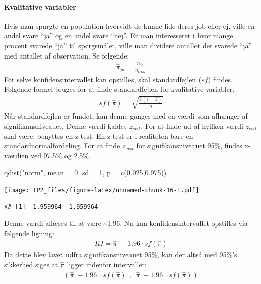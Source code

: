 \documentclass[
]{article}
\newenvironment{Shaded}{\begin{snugshade}}{\end{snugshade}}
\newcommand{\AttributeTok}[1]{\textcolor[rgb]{0.77,0.63,0.00}{#1}}
\newcommand{\DecValTok}[1]{\textcolor[rgb]{0.00,0.00,0.81}{#1}}
\newcommand{\FloatTok}[1]{\textcolor[rgb]{0.00,0.00,0.81}{#1}}
\newcommand{\FunctionTok}[1]{\textcolor[rgb]{0.00,0.00,0.00}{#1}}
\newcommand{\NormalTok}[1]{#1}
\newcommand{\StringTok}[1]{\textcolor[rgb]{0.31,0.60,0.02}{#1}}
\begin{document}
\hypertarget{kvalitative-variabler}{%
\paragraph{Kvalitative variabler}\label{kvalitative-variabler}}

Hvis man spurgte en population hvorvidt de kunne lide deres job eller
ej, ville en andel svare ``ja'' og en andel svare ``nej''. Er man
interesseret i hvor mange procent svarede ``ja'' til spørgsmålet, ville
man dividere antallet der svarede ``ja'' med antallet af observation. Se
følgende: \[
\begin{aligned}
\hat{\pi}_{ja} = \frac{n_{ja}}{n{_{total}}}
\end{aligned}
\] Før selve konfidensintervallet kan opstilles, skal standardfejlen
(\(sf\)) findes. Følgende formel bruges for at finde standardfejlen for
kvalitative variabler: \[
\begin{aligned}
sf(\hat{\pi}) = \sqrt{\frac{\hat{\pi}(1-\hat{\pi})}n{}}
\end{aligned}
\] Når standardfejlen er fundet, kan denne ganges med en værdi som
afhænger af signifikansniveauet. Denne værdi kaldes \(z_{crit}\). For at
finde ud af hvilken værdi \(z_{crit}\) skal være, benyttes en z-test. En
z-test er i realiteten bare en standardnormalfordeling. For at finde
\(z_{crit}\) for signifikansniveauet 95\%, findes x-værdien ved 97.5\%
og 2.5\%.

\begin{Shaded}
\begin{Highlighting}[]
\FunctionTok{qdist}\NormalTok{(}\StringTok{"norm"}\NormalTok{, }\AttributeTok{mean =} \DecValTok{0}\NormalTok{, }\AttributeTok{sd =} \DecValTok{1}\NormalTok{, }\AttributeTok{p =} \FunctionTok{c}\NormalTok{(}\FloatTok{0.025}\NormalTok{,}\FloatTok{0.975}\NormalTok{))}
\end{Highlighting}
\end{Shaded}

\texttt{[image: TP2\_files/figure-latex/unnamed-chunk-16-1.pdf]}

\begin{verbatim}
## [1] -1.959964  1.959964
\end{verbatim}

Denne værdi aflæses til at være \textasciitilde1.96. Nu kan
konfidensintervallet opstilles via følgende ligning: \[
\begin{aligned}
KI = \hat{\pi}\; \pm 1.96\cdot sf(\hat{\pi})
\end{aligned}
\] Da dette blev lavet udfra signifikansniveauet 95\%, kan der altså med
95\%'s sikkerhed siges at \(\hat\pi\) ligger indenfor intervallet: \[
\begin{aligned}
(\hat\pi\;-1.96\;\cdot sf(\hat\pi) \ \ ,\ \  \hat\pi \; + 1.96\;\cdot sf(\hat\pi))
\end{aligned}
\]
\end{document}
